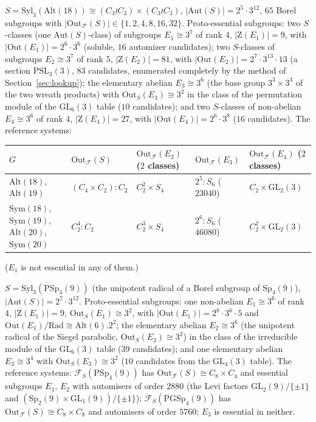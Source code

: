 \documentclass[11pt]{article}
\theoremstyle{definition}
\theoremstyle{remark}
\newcommand{\F}{\mathcal{F}}
\newcommand{\Aut}{\mathrm{Aut}}
\newcommand{\Out}{\mathrm{Out}}
\newcommand{\Syl}{\mathrm{Syl}}
\newcommand{\GL}{\mathrm{GL}}
\newcommand{\PSL}{\mathrm{PSL}}
\newcommand{\PSp}{\mathrm{PSp}}
\newcommand{\Alt}{\mathrm{Alt}}
\newcommand{\Sym}{\mathrm{Sym}}
\newcommand{\Z}{\mathrm{Z}}
\begin{document}
\emph{$S=\Syl_3(\Alt(18))\cong(C_3\wr C_3)\times(C_3\wr C_3)$}, $|\Aut(S)|=2^5\cdot3^{12}$,
$65$ Borel subgroups with $|\Out_\F(S)|\in\{1,2,4,8,16,32\}$.  Proto-essential
subgroups: two $S$-classes (one $\Aut(S)$-class) of subgroups $E_1\cong3^7$
of rank $4$, $|\Z(E_1)|=9$, with $|\Out(E_1)|=2^6\cdot3^6$ (soluble, $16$
automizer candidates); two $S$-classes of subgroups $E_2\cong3^7$ of rank $5$,
$|\Z(E_2)|=81$, with $|\Out(E_2)|=2^7\cdot3^{13}\cdot13$ (a section $\PSL_3(3)$,
$83$ candidates, enumerated completely by the method of
Section~\ref{sec:lookup}); the elementary abelian $E_3\cong3^6$ (the base
group $3^3\times3^3$ of the two wreath products) with $\Out_S(E_3)\cong3^2$
in the class of the permutation module of the $\GL_6(3)$ table ($10$
candidates); and two $S$-classes of non-abelian $E_4\cong3^6$ of rank $4$,
$|\Z(E_4)|=27$, with $|\Out(E_4)|=2^6\cdot3^8$ ($16$ candidates).  The
reference systems:
\begin{center}
\begin{tabular}{lllll}
\toprule
$G$ & $\Out_\F(S)$ & $\Out_\F(E_2)$ ($2$ classes) & $\Out_\F(E_3)$ & $\Out_\F(E_4)$ ($2$ classes)\\
\midrule
$\Alt(18)$, $\Alt(19)$ & $(C_4\times C_2){:}C_2$ & $C_2^2\times S_4$ & $2^5{:}S_6$ ($23040$) & $C_2\times\GL_2(3)$\\
$\Sym(18)$, $\Sym(19)$, $\Alt(20)$, $\Sym(20)$ & $C_2^4{:}C_2$ & $C_2^3\times S_4$ & $2^6{:}S_6$ ($46080$) & $C_2^2\times\GL_2(3)$\\
\bottomrule
\end{tabular}
\end{center}
($E_1$ is not essential in any of them.)

\emph{$S=\Syl_3(\PSp_4(9))$} (the unipotent radical of a Borel subgroup of
$\mathrm{Sp}_4(9)$), $|\Aut(S)|=2^7\cdot3^{12}$.  Proto-essential subgroups: one
non-abelian $E_1\cong3^6$ of rank $4$, $|\Z(E_1)|=9$, $\Out_S(E_1)\cong3^2$,
with $|\Out(E_1)|=2^8\cdot3^6\cdot5$ and $\Out(E_1)/\mathrm{Rad}\cong
\Alt(6).2^2$; the elementary abelian $E_2\cong3^6$ (the unipotent radical
of the Siegel parabolic, $\Out_S(E_2)\cong3^2$) in the class of the
irreducible module of the $\GL_6(3)$ table ($39$ candidates); and one
elementary abelian $E_3\cong3^4$ with $\Out_S(E_3)\cong3^2$ ($10$ candidates
from the $\GL_4(3)$ table).  The reference systems: $\F_S(\PSp_4(9))$ has
$\Out_\F(S)\cong C_8\times C_4$ and essential subgroups $E_1$, $E_2$ with
automisers of order $2880$ (the Levi factors $\GL_2(9)/\{\pm1\}$ and
$(\mathrm{Sp}_2(9)\times\GL_1(9))/\{\pm1\}$); $\F_S(\mathrm{PGSp}_4(9))$ has
$\Out_\F(S)\cong C_8\times C_8$ and automisers of order $5760$; $E_3$ is
essential in neither.
\end{document}
